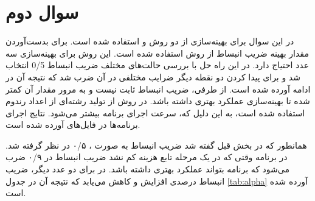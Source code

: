 \section{سوال دوم}
در این سوال برای بهینه‌سازی از دو روش
و
استفاده شده‌ است.
برای بدست‌آوردن مقدار بهینه ضریب انبساط از روش
استفاده شده است. این روش برای بهینه‌سازی سه عدد احتیاج دارد. در این راه حل با بررسی حالت‌های مختلف ضریب انبساط 0/5 انتخاب شد و برای پیدا کردن دو نقطه دیگر ضرایب مختلفی در آن ضرب شد که نتیجه آن در ادامه آورده شده است. از طرفی، ضریب انبساط ثابت نیست و به مرور مقدار آن کمتر شده تا بهینه‌سازی عملکرد بهتری داشته باشد.
در روش  
از تولید رشته‌ای از اعداد رندوم استفاده شده است، به این دلیل که، سرعت اجرای برنامه بیشتر می‌شود. نتایج اجرای برنامه‌ها در فایل‌های 
آورده شده است.



همانطور که در بخش قبل گفته شد ضریب انبساط به صورت ،
۰/۵ در نظر گرفته شد. در برنامه وقتی که در یک مرحله تابع هزینه کم نشد ضریب انبساط در ۰/۹ ضرب می‌شود که برنامه بتواند عملکرد بهتری داشته باشد. در 
برای دو عدد دیگر، ضریب انبساط درصدی افزایش و کاهش می‌یابد که نتیجه آن در جدول 
\ref{tab:alpha}
آورده شده است.



